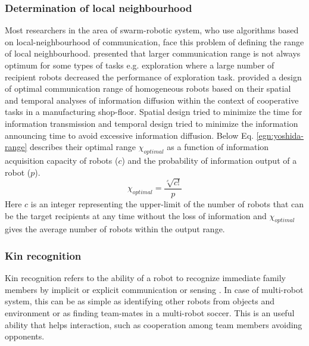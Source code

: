 \subsubsection*{Determination of local neighbourhood}
Most researchers in the area of swarm-robotic system, who use algorithms based on local-neighbourhood of communication, face this problem of defining the range of local neighbourhood.  presented that larger communication range is not always optimum for some types of tasks e.g. exploration where a large number of recipient robots decreased the performance of exploration task.  provided a design of optimal communication range of homogeneous robots based on their spatial and temporal analyses of information diffusion within the context of cooperative tasks in a manufacturing shop-floor. Spatial design tried to minimize the time for information transmission and temporal design tried to minimize the information announcing time to avoid excessive information diffusion. Below Eq. \ref{egn:yoshida-range} describes their optimal range $\chi_{optimal}$ as a function of information acquisition capacity of robots ($c$) and the probability of information output of a robot ($p$). 
\begin{equation}
\chi_{optimal} = \frac{\sqrt [c] {c!}}{p}
\label{egn:yoshida-range}
\end{equation}
Here $c$ is an integer representing the upper-limit of the number of robots that can be the target recipients at any time without the loss of information and $\chi_{optimal}$ gives the average number of robots within the output range.
\subsubsection*{Kin recognition}
Kin recognition refers to the ability of a robot to recognize immediate family members by implicit or explicit communication or sensing \cite{Mataric2007}. In case of multi-robot system, this can be as simple as identifying other robots from objects and environment or as finding team-mates in a multi-robot soccer. This is an useful ability that helps interaction, such as cooperation among team members avoiding opponents. 
